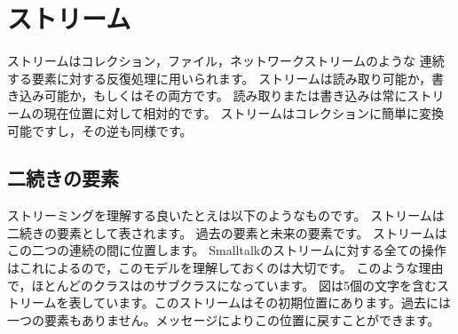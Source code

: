 \documentclass[a4paper,10pt,twoside]{book}
\begin{document}
	\renewcommand{\nnbb}[2]{} %
	\sloppy
\fi
\chapter{ストリーム}



ストリームはコレクション，ファイル，ネットワークストリームのような
連続する要素に対する反復処理に用いられます。
ストリームは読み取り可能か，書き込み可能か，もしくはその両方です。
読み取りまたは書き込みは常にストリームの現在位置に対して相対的です。
ストリームはコレクションに簡単に変換可能ですし，その逆も同様です。



\section{二続きの要素}

ストリーミングを理解する良いたとえは以下のようなものです。
ストリームは二続きの要素として表されます。
過去の要素と未来の要素です。
ストリームはこの二つの連続の間に位置します。
Smalltalkのストリームに対する全ての操作はこれによるので，このモデルを理解しておくのは大切です。
このような理由で，ほとんどのクラスはのサブクラスになっています。
図は5個の文字を含むストリームを表しています。このストリームはその初期位置にあります。\ie 過去には一つの要素もありません。メッセージによりこの位置に戻すことができます。
\end{document}
